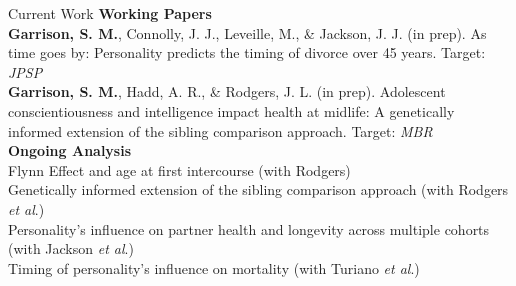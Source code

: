 \documentclass {resume}
\newcommand{\meb}{{\bf Garrison, S. M.}\xspace}
\newcommand{\et}{\textit{et al}.\xspace}
\begin{document}
\begin{rSection}{\textrm{Current Work}}
{\large {\bf Working Papers}}\\
\meb, Connolly, J. J., Leveille, M., \& Jackson, J. J. (in prep). As time goes by: Personality predicts the \hspace* {6 mm}timing of divorce over 45 years. Target: \textit{JPSP}\smallskip\\
\meb, Hadd, A. R., \& Rodgers, J. L. (in prep). Adolescent conscientiousness and intelligence impact \hspace* {6 mm}health at midlife: A genetically informed extension of the sibling comparison approach. Target: \textit{MBR}%
\medskip\\{\large {\bf Ongoing Analysis}}\\
Flynn Effect and age at first intercourse (with Rodgers)\smallskip\\
Genetically informed extension of the sibling comparison approach (with Rodgers \et)\smallskip\\
Personality's influence on partner health and longevity across multiple cohorts (with Jackson \et)\smallskip\\
Timing of personality's influence on mortality (with Turiano \et)%
\end{rSection}

\end{document}
